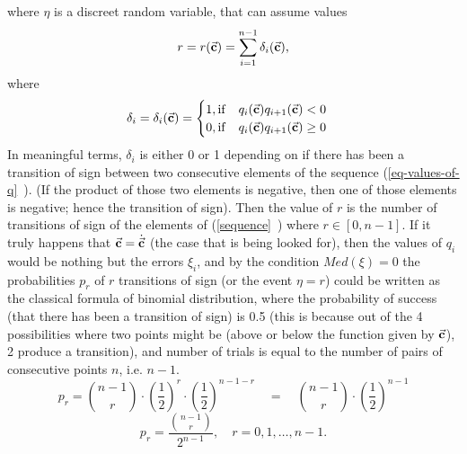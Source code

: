 where $\eta$ is a discreet random variable, that can assume values
\begin{equation}
r=r(\vec{\textbf{c}})=\sum\limits_{i=1}^{n-1} \delta_{i}(\vec{\textbf{c}}), \label{eq-values-of-q}
\end{equation}
where
\begin{equation}
\delta_{i}=\delta_{i}(\vec{\textbf{c}})=
\begin{cases} 
      1, \mathrm{if} \quad q_{i}(\vec{\textbf{c}})q_{i+1}(\vec{\textbf{c}})<0\\
      0, \mathrm{if} \quad q_{i}(\vec{\textbf{c}})q_{i+1}(\vec{\textbf{c}})\geq 0
   \end{cases}
\end{equation}
In meaningful terms, $\delta_{i}$ is either 0 or 1 depending on if there has been a transition of sign between two consecutive elements of the sequence (\vref{eq-values-of-q}~). (If the product of those two elements is negative, then one of those elements is negative; hence the transition of sign). Then the value of $r$ is the number of transitions of sign of the elements of  (\vref{sequence}~) where $r \in [0,n-1]$. If it truly happens that $\vec{\textbf{c}}=\dot{\vec{\textbf{c}}}$ (the case that is being looked for), then the values of $q_{i}$ would be nothing but the errors $\xi_{i}$, and by the condition $Med(\xi)=0$ the probabilities $p_{r}$ of $r$ transitions of sign (or the event $\eta=r$) could be written as the classical formula of binomial distribution, where the probability of success (that there has been a transition of sign) is 0.5 (this is because out of the 4 possibilities where two points might be (above or below the function given by $\vec{\textbf{c}}$), 2 produce a transition), and number of trials is equal to the number of pairs of consecutive points $n$, i.e. $n-1$.
\begin{equation*}
p_{r}= \binom {n-1}r \cdot \left( \frac{1}{2} \right)^r \cdot \left( \frac{1}{2} \right)^{n-1-r} \quad = \quad \binom {n-1}r \cdot \left( \frac{1}{2} \right)^{n-1}
\end{equation*}
\begin{equation}
p_{r}= \frac{\binom {n-1}r}{2^{n-1}}, \quad r = 0,1,\dots,n-1. \label{priori}
\end{equation}
